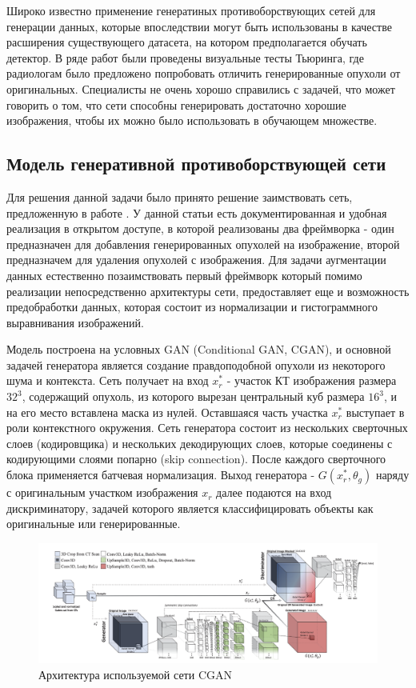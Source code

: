 Широко известно применение генератиных противоборствующих сетей для генерации данных, которые впоследствии могут быть использованы в качестве расширения существующего датасета, на котором предполагается обучать детектор. В ряде работ были проведены визуальные тесты Тьюринга, где радиологам было предложено попробовать отличить генерированные опухоли от оригинальных. Специалисты не очень хорошо справились с задачей, что может говорить о том, что сети способны генерировать достаточно хорошие изображения, чтобы их можно было использовать в обучающем множестве.

\subsection{Модель генеративной противоборствующей сети}

Для решения данной задачи было принято решение заимствовать сеть, предложенную в работе \cite{mirsky}. У данной статьи есть документированная и удобная реализация в открытом доступе, в которой реализованы два фреймворка - один предназначен для добавления генерированных опухолей на изображение, второй предназначем для удаления опухолей с изображения. Для задачи аугментации данных естественно позаимствовать первый фреймворк который помимо реализации непосредственно архитектуры сети, предоставляет еще и возможность предобработки данных, которая состоит из нормализации и гистограммного выравнивания изображений.

Модель построена на условных GAN (Conditional GAN, CGAN), и основной задачей генератора является создание правдоподобной опухоли из некоторого шума и контекста. Сеть получает на вход $x_r^*$ - участок КТ изображения размера $32^3$, содержащий опухоль, из которого вырезан центральный куб размера $16^3$, и на его место вставлена маска из нулей. Оставшаяся часть участка $x_r^*$ выступает в роли контекстного окружения. Сеть генератора состоит из нескольких сверточных слоев (кодировщика) и нескольких декодирующих слоев, которые соединены с кодирующими слоями попарно (skip connection). После каждого сверточного блока применяется батчевая нормализация. Выход генератора - $G(x_r^*, \theta_g)$ наряду с оригинальным участком изображения $x_r$ далее подаются на вход дискриминатору, задачей которого является классифицировать объекты как оригинальные или генерированные.

\begin{figure}[!h]
\includegraphics[width=\linewidth]{images/mirskiy-cgan-architecture.png}
\caption{Архитектура используемой сети CGAN}\label{mirskiy-cgan-architecture}
\centering
\end{figure}

